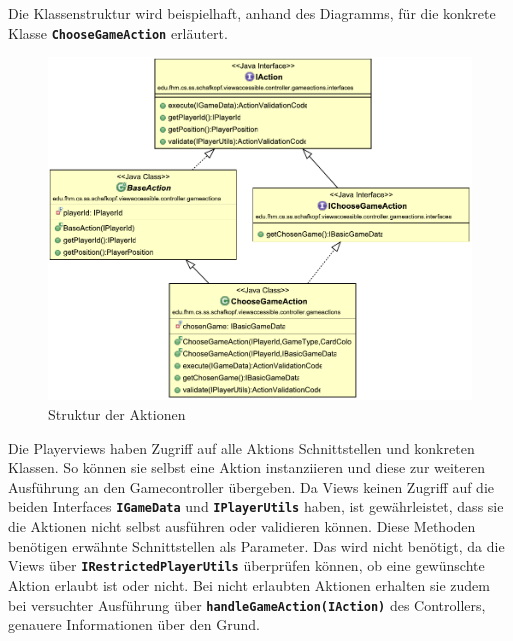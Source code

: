 \documentclass[
							a4paper, 
							11pt, 
							openany, 
							liststotoc,
							parskip=half, 
   							headings=normal
						]{scrreprt}
\begin{document}
{Die Klassenstruktur wird beispielhaft, anhand des Diagramms, für die konkrete Klasse
\textbf{\texttt{ChooseGameAction}} erläutert.

\begin{figure}[H]
\begin{center}
    \includegraphics[width=1.0\textwidth]{./pictures/uml/class_diagram/uml_class_actions.pdf}
	\caption[Anwendung/Aktionen -- Struktur der Aktionen]{Struktur der Aktionen} \label{fig:controller_actions}
\end{center}
\end{figure}

Die Playerviews haben Zugriff auf alle Aktions Schnittstellen und konkreten Klassen. So können sie selbst eine Aktion instanziieren und diese zur weiteren Ausführung an den  Gamecontroller übergeben. Da Views keinen Zugriff auf die beiden Interfaces \textbf{\texttt{IGa\-me\-Da\-ta}} und \textbf{\texttt{IPlayerUtils}} haben, ist gewährleistet, dass sie die Aktionen nicht selbst aus\-füh\-ren oder validieren kön\-nen. Diese Methoden benötigen erwähnte Schnittstellen als Parameter.\newline
Das wird nicht benötigt, da die Views über \textbf{\texttt{IRestrictedPlayerUtils}} überprüfen kön\-nen, ob eine gewünschte Aktion erlaubt ist oder nicht. Bei nicht erlaubten Aktionen erhalten sie zudem bei versuchter Ausführung über \textbf{\texttt{handleGameAction(IAction)}} des Controllers, genauere Informationen über den Grund.

}
\end{document}
